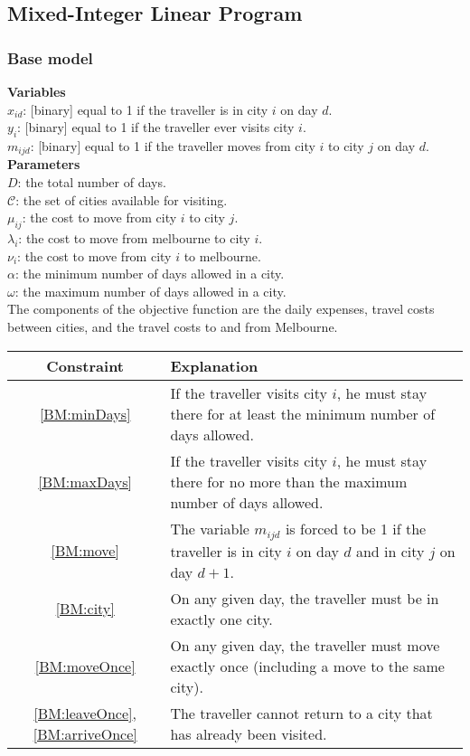 \documentclass[12pt]{article}
\begin{document}
\pagebreak
\subsection{Mixed-Integer Linear Program}

\subsubsection{Base model}
\textbf{Variables} \\
$x_{id}$: [binary] equal to 1 if the traveller is in city $i$ on day $d$. \\ 	%
$y_{i}$: [binary] equal to 1 if the traveller ever visits city $i$. \\		%
$m_{ijd}$: [binary] equal to 1 if the traveller moves from city $i$ to city $j$ on day $d$. \\	%

\textbf{Parameters}\\
$D$: the total number of days. \\
$\mathcal{C}$: the set of cities available for visiting. \\
$\mu_{ij}$: the cost to move from city $i$ to city $j$. \\
$\lambda_{i}$: the cost to move from melbourne to city $i$. \\
$\nu_{i}$: the cost to move from city $i$ to melbourne. \\
$\alpha$: the minimum number of days allowed in a city. \\
$\omega$: the maximum number of days allowed in a city. \\

The components of the objective function are the daily expenses, travel costs between cities, and the travel costs to and from Melbourne.\\

\begin{tabular}{c | p{14cm} }
	\textbf{Constraint} & \textbf{Explanation} \\
	\hline
	\ref{BM:minDays} & If the traveller visits city $i$, he must stay there for at least the minimum number of days allowed. \\
	\hline
	\ref{BM:maxDays} &  If the traveller visits city $i$, he must stay there for no more than the maximum number of days allowed. \\
	\hline
	\ref{BM:move} & The variable $m_{ijd}$ is forced to be 1 if the traveller is in city $i$ on day $d$ and in city $j$ on day $d+1$. \\
	\hline
	\ref{BM:city} & On any given day, the traveller must be in exactly one city. \\
	\hline
	\ref{BM:moveOnce} & On any given day, the traveller must move exactly once (including a move to the same city). \\
	\hline
	\ref{BM:leaveOnce}, \ref{BM:arriveOnce} & The traveller cannot return to a city that has already been visited. \\
\end{tabular}\\
\end{document}
